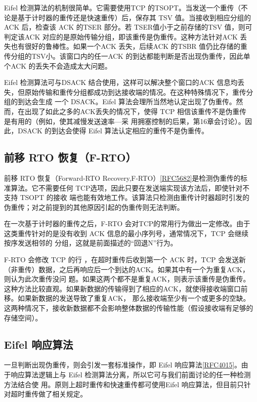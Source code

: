 Eifel 检测算法的机制很简单。它需要使用TCP 的TSOPT。当发送一个重传（不论是基于计时器的重传还是快速重传）后，保存其 TSV
值。当接收到相应分组的ACK 后，检查该
ACK 的TSER 部分。若 TSER值小于之前存储的TSV 值，则可判定该ACK
对应的是原始传输分组，即该重传是伪重传。这种方法针对ACK 丢失也有很好的鲁棒性。如果一个ACK
丢失，后续ACK 的TSBR 值仍比存储的重传分组的TSV小。该窗口内的任一ACK 的到达都能判断是否出现伪重传，因此单个ACK 的丢失不会造成太大问题。

Eifel 检测算法可与DSACK 结合使用，这样可以解决整个窗口的ACK
信息均丢失，但原始传输和重传分组都成功到达接收端的情况。在这种特殊情况下，重传分组的到达会生成
一个 DSACK。Eifel 算法会理所当然地认定出现了伪重传。然而，在出现了如此之多的ACK丢失的情况下，使得 TCP
相信该重传不是伪重传是有用的（例如，使其减慢发送速率—采
用拥塞控制的后果，第16章会讨论）。因此，DSACK 的到达会使得 Eifel 算法认定相应的重传不是伪重传。

\subsection{前移 RTO 恢复（F-RTO）}
前移 RTO 恢复（Forward-RTO
Recovery,F-RTO）\href{https://www.rfc-editor.org/rfc/rfc5682}{[RFC5682]}是检测伪重传的标准算法。它不需要任何
TCP选项，因此只要在发送端实现该方法后，即使针对不支持 TSOPT 的接收
端也能有效地工作。该算法只检测由重传计时器超时引发的伪重传；对之前提到的其他原因引起的伪重传则无法判断。

在一次基于计时器的重传之后，F-RTO 会对TCP的常用行为做出一定修改。由于这类重传针对的是没有收到 ACK
信息的最小序列号，通常情况下，TCP 会继续按序发送相邻的
分组，这就是前面描述的“回退N”行为。

F-RTO 会修改 TCP 的行 ，在超时重传后收到第一个 ACK 时，TCP
会发送新（非重传）数据，之后再响应后一个到达的ACK。如果其中有一个为重复ACK，则认为此次重传没问
题。如果这两个都不是重复ACK，则表示该重传是伪重传。这种方法比较直观。如果新数据的传输得到了相应的ACK，就使得接收端窗口前移。如果新数据的发送导致了重复ACK，
那么接收端至少有一个或更多的空缺。这两种情况下，接收新数据都不会影响整体数据的传输性能（假设接收端有足够的存储空间）。

\subsection{Eifel 响应算法}
一旦判断出现伪重传，则会引发一套标准操作，即 Eifel
响应算法\href{https://www.rfc-editor.org/rfc/rfc4015}{[RFC4015]}。由于响应算法逻辑上与
Eifel 检测算法分离，所以它可与我们前面讨论的任一种检测方法结合使
用。原则上超时重传和快速重传都可使用Eifel 响应算法，但目前只针对超时重传做了相关规定。

